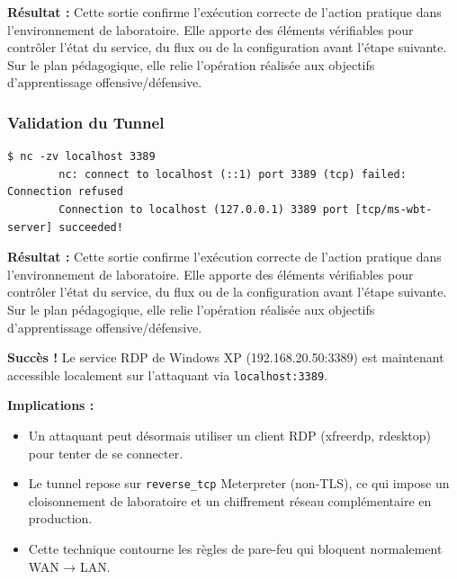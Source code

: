 \documentclass[12pt,a4paper,openany]{report}
\begin{document}
	\textbf{Résultat :} Cette sortie confirme l'exécution correcte de l'action pratique dans l'environnement de laboratoire. Elle apporte des éléments vérifiables pour contrôler l'état du service, du flux ou de la configuration avant l'étape suivante. Sur le plan pédagogique, elle relie l'opération réalisée aux objectifs d'apprentissage offensive/défensive.
	
	
	\subsubsection{Validation du Tunnel}
	
	\begin{lstlisting}[caption=Test de Connectivité via Netcat]
		$ nc -zv localhost 3389
		nc: connect to localhost (::1) port 3389 (tcp) failed: Connection refused
		Connection to localhost (127.0.0.1) 3389 port [tcp/ms-wbt-server] succeeded!
	\end{lstlisting}
	
	\textbf{Résultat :} Cette sortie confirme l'exécution correcte de l'action pratique dans l'environnement de laboratoire. Elle apporte des éléments vérifiables pour contrôler l'état du service, du flux ou de la configuration avant l'étape suivante. Sur le plan pédagogique, elle relie l'opération réalisée aux objectifs d'apprentissage offensive/défensive.
	
	
	\textcolor{green}{\checkmark} \textbf{Succès !} Le service RDP de Windows XP (192.168.20.50:3389) est maintenant accessible localement sur l'attaquant via \texttt{localhost:3389}.
	
	\textbf{Implications :}
	\begin{itemize}
		\item Un attaquant peut désormais utiliser un client RDP (xfreerdp, rdesktop) pour tenter de se connecter.
		\item Le tunnel repose sur \texttt{reverse\_tcp} Meterpreter (non-TLS), ce qui impose un cloisonnement de laboratoire et un chiffrement réseau complémentaire en production.
		\item Cette technique contourne les règles de pare-feu qui bloquent normalement WAN → LAN.
	\end{itemize}
	
\end{document}
